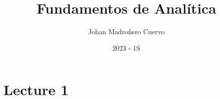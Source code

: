 \documentclass{article}
\author{Johan Madroñero Cuervo}
\title{Fundamentos de Analítica}
\date{2023 - 1S}
\theoremstyle{definition}
\begin{document}
\maketitle
\thispagestyle{empty}
\newpage
\tableofcontents
\thispagestyle{empty}
\newpage

\section{Lecture 1}
\end{document}
